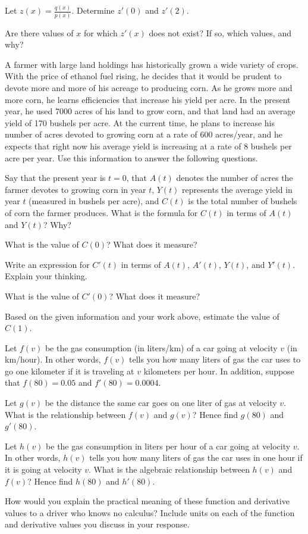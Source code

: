 \begin{exercises}
	\item Let $z(x) = \frac{q(x)}{p(x)}$.  Determine $z'(0)$ and $z'(2)$.
	\item Are there values of $x$ for which $z'(x)$ does not exist?  If so, which values, and why?	
\ea
\item A farmer with large land holdings has historically grown a wide variety of crops.  With the price of ethanol fuel rising, he decides that it would be prudent to devote more and more of his acreage to producing corn.  As he grows more and more corn, he learns efficiencies that increase his yield per acre.  In the present year, he used 7000 acres of his land to grow corn, and that land had an average yield of 170 bushels per acre.  At the current time, he plans to increase his number of acres devoted to growing corn at a rate of 600 acres/year, and he expects that right now his average yield is increasing at a rate of 8 bushels per acre per year.  Use this information to answer the following questions.
\ba
	\item Say that the present year is $t = 0$, that $A(t)$ denotes the number of acres the farmer devotes to growing corn in year $t$, $Y(t)$ represents the average yield in year $t$ (measured in bushels per acre), and $C(t)$ is the total number of bushels of corn the farmer produces.  What is the formula for $C(t)$ in terms of $A(t)$ and $Y(t)$?  Why?
	\item What is the value of $C(0)$?  What does it measure?
	\item Write an expression for $C'(t)$ in terms of $A(t)$, $A'(t)$, $Y(t)$, and $Y'(t)$.  Explain your thinking.
	\item What is the value of $C'(0)$?  What does it measure?
	\item Based on the given information and your work above, estimate the value of $C(1)$.	
\ea
\item Let $f(v)$ be the gas consumption (in liters/km) of a car going at velocity $v$ (in km/hour). In other words, $f(v)$ tells you how many liters of gas the car uses to go one  kilometer if it is traveling at $v$ kilometers per hour. In addition, suppose that $f(80)=0.05$ and $f'(80) = 0.0004$.
\ba
	\item Let $g(v)$ be the distance the same car goes on one liter of gas at velocity $v$.  What is the relationship between $f(v)$ and $g(v)$? Hence find $g(80)$ and $g'(80)$.
      	\item Let $h(v)$ be the gas consumption in liters per hour of a car going at velocity $v$. In other words, $h(v)$ tells you how many liters of gas the car uses in one hour if it is going at velocity $v$.   What is the algebraic relationship between $h(v)$ and $f(v)$?  Hence find $h(80)$ and $h'(80)$.     
	\item How would you explain the practical meaning of these function and derivative values to a driver who knows no calculus?  Include units on each of the function and derivative values you discuss in your response.  
\ea
\end{exercises}
\afterexercises
